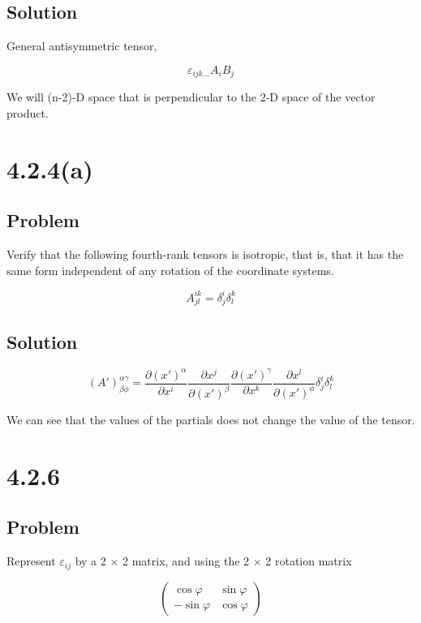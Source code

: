 \documentclass[12pt]{article}
\begin{document}
\subsection{Solution}

General antisymmetric tensor,

\[
    \varepsilon_{ijk \ldots} A_i B_j
\]

We will (n-2)-D space that is perpendicular to the 2-D space of the vector product.

\newpage
\section{4.2.4(a)}

\subsection{Problem}

Verify that the following fourth-rank tensors is isotropic, that is, that it has the
same form independent of any rotation of the coordinate systems.

\[
    A^{ik}_{jl} = \delta^i_j \delta^k_l
\]

\subsection{Solution}

\[
    {(A')}^{\alpha \gamma}_{\beta \phi} = \frac{\partial {(x')}^\alpha}{\partial x^i}\frac{\partial x^j}{\partial {(x')}^\beta}\frac{\partial {(x')}^\gamma}{\partial x^k}\frac{\partial x^l}{\partial {(x')}^\phi}\delta^i_j \delta^k_l
\]

We can see that the values of the partials does not change the value of the tensor.

\newpage
\section{4.2.6}

\subsection{Problem}

Represent \(\varepsilon_{ij}\) by a 2 \(\times \) 2 matrix, and using the 2 \(\times \) 2 rotation matrix

\[
    \begin{pmatrix}
        \cos \varphi  & \sin \varphi \\
        -\sin \varphi & \cos \varphi
    \end{pmatrix}
\]
\end{document}
